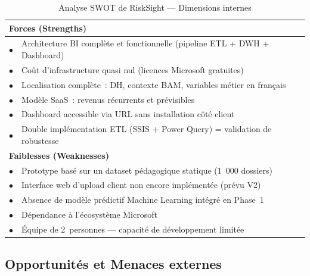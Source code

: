 \documentclass[12pt, a4paper]{report}
\begin{document}
\begin{table}[H]
\centering
\caption{Analyse SWOT de RiskSight --- Dimensions internes}
\label{tab:swot_interne}
\renewcommand{\arraystretch}{1.4}
\begin{tabularx}{\textwidth}{p{0.5cm} X}
\toprule
\multicolumn{2}{l}{\cellcolor{successcolor!15}\textbf{\textcolor{successcolor}{Forces (Strengths)}}} \\
\midrule
$\bullet$ & Architecture BI complète et fonctionnelle (pipeline ETL + DWH + Dashboard) \\
$\bullet$ & Coût d'infrastructure quasi nul (licences Microsoft gratuites) \\
$\bullet$ & Localisation complète~: DH, contexte BAM, variables métier en français \\
$\bullet$ & Modèle SaaS~: revenus récurrents et prévisibles \\
$\bullet$ & Dashboard accessible via URL sans installation côté client \\
$\bullet$ & Double implémentation ETL (SSIS + Power Query) = validation de robustesse \\
\midrule
\multicolumn{2}{l}{\cellcolor{dangercolor!15}\textbf{\textcolor{dangercolor}{Faiblesses (Weaknesses)}}} \\
\midrule
$\bullet$ & Prototype basé sur un dataset pédagogique statique (1~000 dossiers) \\
$\bullet$ & Interface web d'upload client non encore implémentée (prévu V2) \\
$\bullet$ & Absence de modèle prédictif Machine Learning intégré en Phase~1 \\
$\bullet$ & Dépendance à l'écosystème Microsoft \\
$\bullet$ & Équipe de 2~personnes --- capacité de développement limitée \\
\bottomrule
\end{tabularx}
\end{table}

\subsection{Opportunités et Menaces externes}
\end{document}

